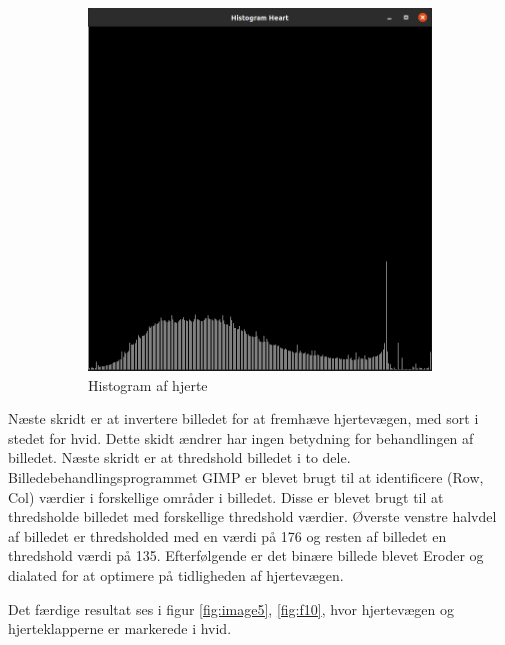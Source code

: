 \documentclass{article}
\begin{document}
\begin{figure}[H]
\begin{subfigure}[b]{0.49\textwidth}
        \includegraphics[width=\textwidth]{Image/HistHeart.png}
        \caption{Histogram af hjerte}
        \label{fig:f8}
    \end{subfigure}
    \caption{}
    \label{fig:image4}
\end{figure}
Næste skridt er at invertere billedet for at fremhæve hjertevægen, med sort i stedet for hvid. Dette skidt ændrer har ingen betydning for behandlingen af billedet.\newline 
Næste skridt er at thredshold billedet i to dele. Billedebehandlingsprogrammet GIMP er blevet brugt til at identificere (Row, Col) værdier i forskellige områder i billedet. Disse er blevet brugt til at thredsholde billedet med forskellige thredshold værdier. Øverste venstre halvdel af billedet er thredsholded med en værdi på 176 og resten af billedet en thredshold værdi på 135. Efterfølgende er det binære billede blevet Eroder og dialated for at optimere på tidligheden af hjertevægen.\newline 

Det færdige resultat ses i figur \ref{fig:image5}, \ref{fig:f10}, hvor hjertevægen og hjerteklapperne er markerede i hvid. 
\end{document}
